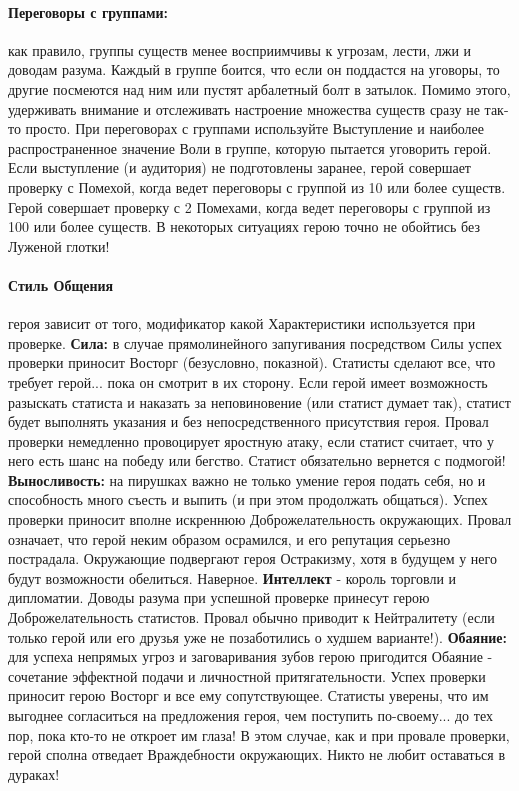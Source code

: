 \paragraph{Переговоры с группами:} как правило, группы существ менее восприимчивы к угрозам, лести, лжи и доводам разума. Каждый в группе боится, что если он поддастся на уговоры, то другие посмеются над ним или пустят арбалетный болт в затылок. Помимо этого, удерживать внимание и отслеживать настроение множества существ сразу не так-то просто. При переговорах с группами используйте Выступление и наиболее распространенное значение Воли в группе, которую пытается уговорить герой. Если выступление (и аудитория) не подготовлены заранее, герой совершает проверку с Помехой, когда ведет переговоры с группой из 10 или более существ. Герой совершает проверку с 2 Помехами, когда ведет переговоры с группой из 100 или более существ. В некоторых ситуациях герою точно не обойтись без Луженой глотки!

\paragraph{Стиль Общения} героя зависит от того, модификатор какой Характеристики используется при проверке.
\newline \textbf{Сила:} в случае прямолинейного запугивания посредством Силы успех проверки приносит Восторг (безусловно, показной). Статисты сделают все, что требует герой... пока он смотрит в их сторону. Если герой имеет возможность разыскать статиста и наказать за неповиновение (или статист думает так), статист будет выполнять указания и без непосредственного присутствия героя. Провал проверки немедленно провоцирует яростную атаку, если статист считает, что у него есть шанс на победу или бегство. Статист обязательно вернется с подмогой!
\newline \textbf{Выносливость:} на пирушках важно не только умение героя подать себя, но и способность много съесть и выпить (и при этом продолжать общаться). Успех проверки приносит вполне искреннюю Доброжелательность окружающих. Провал означает, что герой неким образом осрамился, и его репутация серьезно пострадала. Окружающие подвергают героя Остракизму, хотя в будущем у него будут возможности обелиться. Наверное.
\newline \textbf{Интеллект} - король торговли и дипломатии. Доводы разума при успешной проверке принесут герою Доброжелательность статистов. Провал обычно приводит к Нейтралитету (если только герой или его друзья уже не позаботились о худшем варианте!).
\newline \textbf{Обаяние:} для успеха непрямых угроз и заговаривания зубов герою пригодится Обаяние - сочетание эффектной подачи и личностной притягательности. Успех проверки приносит герою Восторг и все ему сопутствующее. Статисты уверены, что им выгоднее согласиться на предложения героя, чем поступить по-своему... до тех пор, пока кто-то не откроет им глаза! В этом случае, как и при провале проверки, герой сполна отведает Враждебности окружающих. Никто не любит оставаться в дураках!
